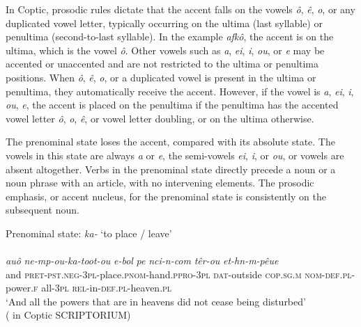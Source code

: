 \documentclass[output=paper,colorlinks,citecolor=brown ,chinesefont]{langscibook}
\begin{document}
In Coptic, prosodic rules dictate that the accent falls on the vowels  \textit{ô},  \textit{ê},  \textit{o}, or any duplicated vowel letter,  typically occurring on the ultima (last syllable) or penultima (second-to-last syllable). In the example  \textit{afkô}, the accent is on the ultima, which is the vowel  \textit{ô}. Other vowels such as  \textit{a},  \textit{ei},  \textit{i},  \textit{ou}, or  \textit{e} may be accented or unaccented and are not restricted to the ultima or penultima positions. When  \textit{ô},  \textit{ê},  \textit{o}, or a duplicated vowel is present in the ultima or penultima, they automatically receive the accent. However, if the vowel is  \textit{a},  \textit{ei},  \textit{i},  \textit{ou},  \textit{e}, the accent is placed on the penultima if the penultima has the accented vowel letter  \textit{ô},  \textit{o},  \textit{ê}, or vowel letter doubling, or on the ultima otherwise.

The prenominal state loses the  accent, compared with its absolute state. The vowels in this state are always  \textit{a} or  \textit{e}, the semi-vowels  \textit{ei},  \textit{i}, or  \textit{ou}, or vowels are absent altogether. Verbs in the prenominal state directly precede a noun or a noun phrase with an article, with no intervening elements. The prosodic emphasis, or accent nucleus, for the prenominal state is consistently on the subsequent noun.

\begin{exe}
    \ex\label{prenominal} Prenominal state:  \textit{ka-} ‘to place / leave' \\
    \glll {}												 \\
    \textit{auô} 	\textit{ne-mp-ou-ka-toot-ou} 				\textit{e-bol} 		\textit{pe} 	\textit{nci-n-com} 		\textit{têr-ou} 		\textit{et-hn-m-pêue}\\
    and 	\textsc{pret}-\textsc{pst}.\textsc{neg}-3\textsc{pl}-place.\textsc{pnom}-hand.\textsc{ppro}-3\textsc{pl} 	\textsc{dat}-outside 	\textsc{cop}.\textsc{sg}.\textsc{m} \textsc{nom}-\textsc{def}.\textsc{pl}-power.\textsc{f} 	all-3\textsc{pl} 		\textsc{rel}-in-\textsc{def}.\textsc{pl}-heaven.\textsc{pl} \\
    \glt ‘And all the powers that are in heavens did not cease being disturbed' \\
    \hspace*{\fill}( in Coptic SCRIPTORIUM) 
\end{exe}
\end{document}
